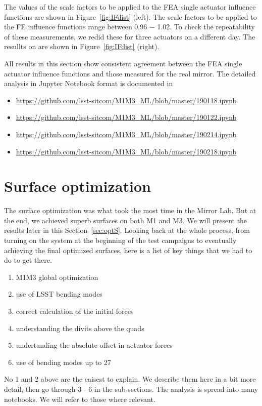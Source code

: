 \documentclass [twoside,openbib,12pt]{article}
\newcommand{\bitm}{\begin{itemize}}
\newcommand{\eitm}{\end{itemize}}
\newcommand{\bnum}{\begin{enumerate}}
\newcommand{\enum}{\end{enumerate}}
\begin{document}
The values of the scale factors to be applied to the FEA single
actuator influence functions are shown in Figure~\ref{fig:IFdist}
(left).
The scale factors to be applied to the FE influence functions range
between 0.96 $-$ 1.02.
To check the repeatability of these measurements, we redid these for
three actuators on a different day. The resullts on are shown in
Figure~\ref{fig:IFdist} (right).

All results in this section show consistent agreement between the FEA single actuator
influence functions and those measured for the real mirror.
The detailed analysis in Jupyter Notebook format is documented in
\bitm
\item \url{https://github.com/lsst-sitcom/M1M3_ML/blob/master/190118.ipynb}
\item \url{https://github.com/lsst-sitcom/M1M3_ML/blob/master/190122.ipynb}
\item \url{https://github.com/lsst-sitcom/M1M3_ML/blob/master/190214.ipynb}
\item \url{https://github.com/lsst-sitcom/M1M3_ML/blob/master/190218.ipynb}
  \eitm

\section{Surface optimization}

The surface optimization was what took the most time in the Mirror
Lab. But at the end, we achieved superb surfaces on both M1 and M3. We
will present the results later in this Section~\ref{sec:optS}.
Looking back at the whole process, from turning on the system at the
beginning of the test campaigns to eventually
achieving the final optimized surfaces, here is a list of key things
that we had to do to get there.
\bnum
\item M1M3 global optimization
\item use of LSST bending modes
  \item correct calculation of the initial forces
  \item understanding the divits above the quads
    \item undertanding the absolute offset in actuator forces
  \item use of bending modes up to 27
\enum

No 1 and 2 above are the eaisest to explain. We describe them here in
a bit more detail, then go through 3 - 6 in the sub-sections.
The analysis is spread into many notebooks. We will refer to those
where relevant.
\end{document}
